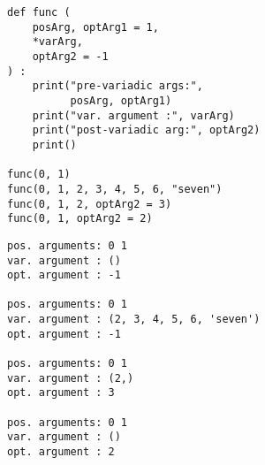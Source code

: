 
\begin{frame}[fragile]
%
\begin{tcbraster}[raster columns=2,
                  raster equal height,
                  nobeforeafter,
                  raster column skip=0.5cm]
\begin{codebox}
\begin{verbatim}
def func (
    posArg, optArg1 = 1,
    *varArg,
    optArg2 = -1
) :
    print("pre-variadic args:",
          posArg, optArg1)
    print("var. argument :", varArg)
    print("post-variadic arg:", optArg2)
    print()

func(0, 1)
func(0, 1, 2, 3, 4, 5, 6, "seven")
func(0, 1, 2, optArg2 = 3)
func(0, 1, optArg2 = 2)
\end{verbatim}
\end{codebox}
%
\begin{cmdbox}
\begin{verbatim}
pos. arguments: 0 1
var. argument : ()
opt. argument : -1

pos. arguments: 0 1
var. argument : (2, 3, 4, 5, 6, 'seven')
opt. argument : -1

pos. arguments: 0 1
var. argument : (2,)
opt. argument : 3

pos. arguments: 0 1
var. argument : ()
opt. argument : 2
\end{verbatim}
\end{cmdbox}
\end{tcbraster}
%
\end{frame}


